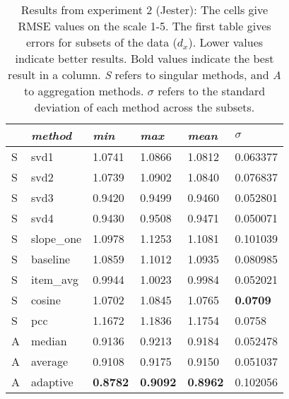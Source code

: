 \begin{table}[p]
  \begin{tabular*}{\textwidth}{ l p{3cm} p{2cm} p{2cm} p{2cm} p{2cm} }
    \toprule
      ~ & \emph{method} & 
      \emph{min} & \emph{max} & \emph{mean} & $\sigma$\\
    \midrule
S & svd1       &  1.0741  &  1.0866  &  1.0812  &  0.063377  \\
S & svd2       &  1.0739  &  1.0902  &  1.0840  &  0.076837  \\
S & svd3       &  0.9420  &  0.9499  &  0.9460  &  0.052801  \\
S & svd4       &  0.9430  &  0.9508  &  0.9471  &  0.050071  \\
S & slope\_one &  1.0978  &  1.1253  &  1.1081  &  0.101039  \\
S & baseline   &  1.0859  &  1.1012  &  1.0935  &  0.080985  \\
S & item\_avg  &  0.9944  &  1.0023  &  0.9984  &  0.052021  \\
S & cosine     &  1.0702  &  1.0845  &  1.0765  &  \textbf{0.0709}    \\
S & pcc        &  1.1672  &  1.1836  &  1.1754  &  0.0758    \\
\midrule
A & median   &  0.9136  &  0.9213  &  0.9184  &  0.052478  \\
A & average  &  0.9108  &  0.9175  &  0.9150  &  0.051037  \\
A & adaptive  &  \textbf{0.8782}  &  \textbf{0.9092}  &  \textbf{0.8962}  &  0.102056  \\
    \bottomrule
  \end{tabular*}
  \vspace{2em}

  \caption[Results from Experiment 2]{
    Results from experiment 2 (Jester):
    The cells give RMSE values on the scale 1-5.
    The first table gives errors for subsets of the data ($d_x$).
    Lower values indicate better results.
    Bold values indicate the best result in a column.
    \emph{S} refers to singular methods, and \emph{A} to aggregation methods.
    $\sigma$ refers to the standard deviation of each method across the subsets.
  }
  \label{table:results:e2}
\end{table}

